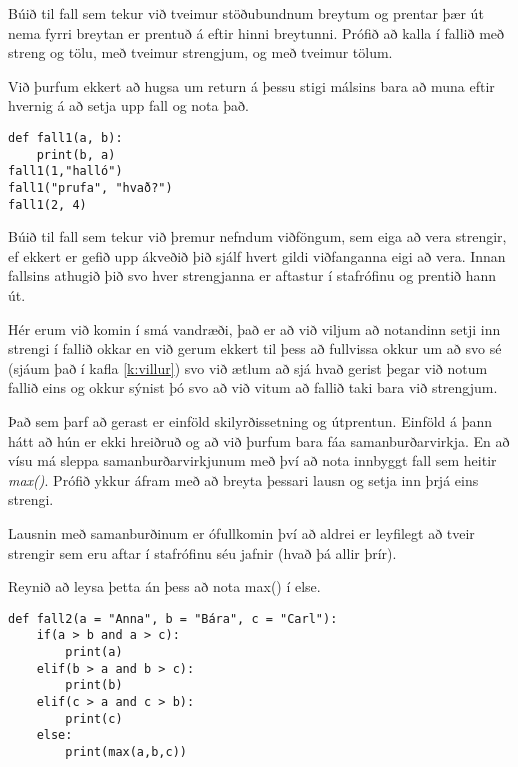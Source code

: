 \begin{exercise}\label{fun1}
Búið til fall sem tekur við tveimur stöðubundnum breytum og prentar þær út nema fyrri breytan er prentuð á eftir hinni breytunni.
Prófið að kalla í fallið með streng og tölu, með tveimur strengjum, og með tveimur tölum.
\end{exercise}
\begin{Answer}[ref={fun1}]
Við þurfum ekkert að hugsa um return á þessu stigi málsins bara að muna eftir hvernig á að setja upp fall og nota það.
	\begin{lstlisting}
def fall1(a, b):
	print(b, a)
fall1(1,"halló")
fall1("prufa", "hvað?")	
fall1(2, 4)\end{lstlisting}
\end{Answer}


\begin{exercise}\label{fun2}
Búið til fall sem tekur við þremur nefndum viðföngum, sem eiga að vera strengir, ef ekkert er gefið upp ákveðið þið sjálf hvert gildi viðfanganna eigi að vera.
Innan fallsins athugið þið svo hver strengjanna er aftastur í stafrófinu og prentið hann út.
\end{exercise}
\begin{Answer}[ref={fun2}]
Hér erum við komin í smá vandræði, það er að við viljum að notandinn setji inn strengi í fallið okkar en við gerum ekkert til þess að fullvissa okkur um að svo sé (sjáum það í kafla \ref{k:villur}) svo við ætlum að sjá hvað gerist þegar við notum fallið eins og okkur sýnist þó svo að við vitum að fallið taki bara við strengjum.

Það sem þarf að gerast er einföld skilyrðissetning og útprentun.
Einföld á þann hátt að hún er ekki hreiðruð og að við þurfum bara fáa samanburðarvirkja.
En að vísu má sleppa samanburðarvirkjunum með því að nota innbyggt fall sem heitir \emph{max()}.
Prófið ykkur áfram með að breyta þessari lausn og setja inn þrjá eins strengi.

Lausnin með samanburðinum er ófullkomin því að aldrei er leyfilegt að tveir strengir sem eru aftar í stafrófinu séu jafnir (hvað þá allir þrír).

Reynið að leysa þetta án þess að nota max() í else.
\begin{lstlisting}
def fall2(a = "Anna", b = "Bára", c = "Carl"):
	if(a > b and a > c):
		print(a)
	elif(b > a and b > c):
		print(b)
	elif(c > a and c > b):
		print(c)
	else:
		print(max(a,b,c))\end{lstlisting}
\end{Answer}

